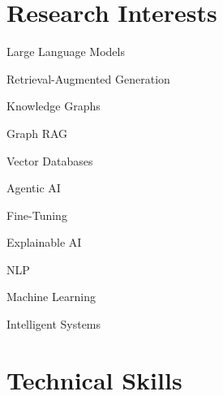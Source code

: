 \documentclass[letterpaper,11pt]{article}
\newcommand{\techtag}[1]{
  {\small\colorbox{techbg}{\textcolor{primary}{#1}}}
}
\begin{document}

\section{Research Interests}

\begin{center}

\techtag{Large Language Models}
\techtag{Retrieval-Augmented Generation}
\techtag{Knowledge Graphs}
\techtag{Graph RAG}
\techtag{Vector Databases}
\techtag{Agentic AI}
\techtag{Fine-Tuning}
\techtag{Explainable AI}
\techtag{NLP}
\techtag{Machine Learning}
\techtag{Intelligent Systems}

\end{center}



\section{Technical Skills}
\end{document}
